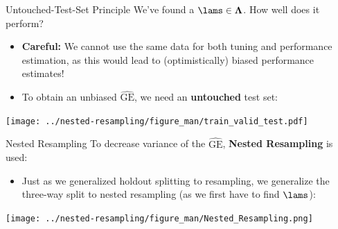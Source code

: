 \documentclass[11pt,compress,t,notes=noshow, xcolor=table]{beamer}
\begin{document}
\begin{vbframe}{Untouched-Test-Set Principle}
We've found a $\lams \in \Lam$. How well does it perform?
\begin{itemize}
\item \textbf{Careful:} We cannot use the same data for both tuning and performance estimation, as this would lead to (optimistically) biased performance estimates!
\item To obtain an unbiased $\widehat{\mathrm{GE}}$, we need an \textbf{untouched} test set:
\end{itemize}
\begin{center}
\texttt{[image: ../nested-resampling/figure\_man/train\_valid\_test.pdf]}
\end{center}

\end{vbframe}



\begin{vbframe}{Nested Resampling}
To decrease variance of the $\widehat{\mathrm{GE}}$, \textbf{Nested Resampling} is used:

\begin{itemize}
\item \small Just as we generalized holdout splitting to resampling, we generalize the three-way split to nested resampling (as we first have to find $\lams$):
\end{itemize}

\begin{center}
\texttt{[image: ../nested-resampling/figure\_man/Nested\_Resampling.png]}
\end{center}

\end{vbframe}
\end{document}
